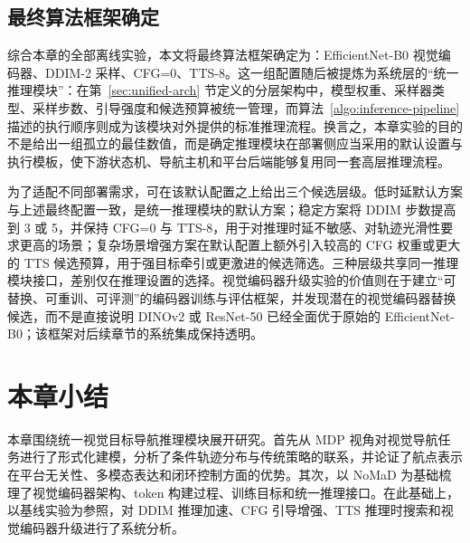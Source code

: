 \subsection{最终算法框架确定}

综合本章的全部离线实验，本文将最终算法框架确定为：EfficientNet-B0 视觉编码器、DDIM-2 采样、CFG=0、TTS-8。这一组配置随后被提炼为系统层的``统一推理模块''：在第~\ref{sec:unified-arch} 节定义的分层架构中，模型权重、采样器类型、采样步数、引导强度和候选预算被统一管理，而算法~\ref{algo:inference-pipeline} 描述的执行顺序则成为该模块对外提供的标准推理流程。换言之，本章实验的目的不是给出一组孤立的最佳数值，而是确定推理模块在部署侧应当采用的默认设置与执行模板，使下游状态机、导航主机和平台后端能够复用同一套高层推理流程。

为了适配不同部署需求，可在该默认配置之上给出三个候选层级。低时延默认方案与上述最终配置一致，是统一推理模块的默认方案；稳定方案将 DDIM 步数提高到 3 或 5，并保持 CFG=0 与 TTS-8，用于对推理时延不敏感、对轨迹光滑性要求更高的场景；复杂场景增强方案在默认配置上额外引入较高的 CFG 权重或更大的 TTS 候选预算，用于强目标牵引或更激进的候选筛选。三种层级共享同一推理模块接口，差别仅在推理设置的选择。视觉编码器升级实验的价值则在于建立``可替换、可重训、可评测''的编码器训练与评估框架，并发现潜在的视觉编码器替换候选，而不是直接说明 DINOv2 或 ResNet-50 已经全面优于原始的 EfficientNet-B0；该框架对后续章节的系统集成保持透明。

\section{本章小结}

本章围绕统一视觉目标导航推理模块展开研究。首先从 MDP 视角对视觉导航任务进行了形式化建模，分析了条件轨迹分布与传统策略的联系，并论证了航点表示在平台无关性、多模态表达和闭环控制方面的优势。其次，以 NoMaD 为基础梳理了视觉编码器架构、token 构建过程、训练目标和统一推理接口。在此基础上，以基线实验为参照，对 DDIM 推理加速、CFG 引导增强、TTS 推理时搜索和视觉编码器升级进行了系统分析。
